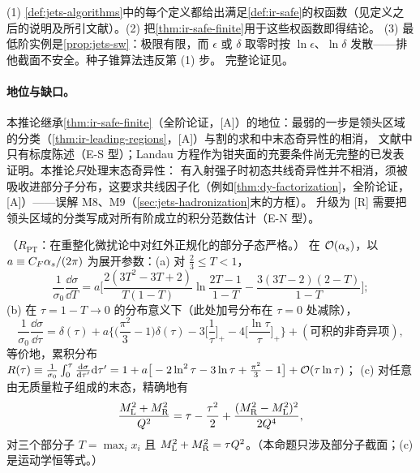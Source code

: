 \begin{proofsketch}
(1) \cref{def:jets-algorithms}中的每个定义都给出满足\cref{def:ir-safe}的权函数（见定义之后的说明及所引文献）。(2) 把\cref{thm:ir-safe-finite}用于这些权函数即得结论。
(3) 最低阶实例是\cref{prop:jets-sw}：极限有限，而 $\epsilon$ 或 $\delta$ 取零时按 $\ln\epsilon$、$\ln\delta$ 发散——排他截面不安全。种子锥算法违反第 (1) 步。
完整论证见\cite{Sterman1978a,Sterman1978b,Sterman:1979uw,StermanWeinberg1977}。
\end{proofsketch}

\paragraph{地位与缺口。}
本推论继承\cref{thm:ir-safe-finite}（全阶论证，[A]）的地位：最弱的一步是领头区域的分类（\cref{thm:ir-leading-regions}，[A]）与割的求和中末态奇异性的相消，
文献中只有标度陈述（E-S 型）；Landau 方程作为钳夹面的充要条件尚无完整的已发表证明\cite[第~5.4.3~节]{Collins2011}。本推论\emph{只}处理末态奇异性：
有入射强子时初态共线奇异性并不相消，须被吸收进部分子分布，这要求共线因子化（例如\cref{thm:dy-factorization}，全阶论证，[A]）——误解 M8、M9（\cref{sec:jets-hadronization}末的方框）。
升级为 [R] 需要把领头区域的分类写成对所有阶成立的积分范数估计（E-N 型）。

\begin{proposition}\label{prop:jets-thrust-lo}
（$R_{\mathrm{PT}}$：在重整化微扰论中对红外正规化的部分子态严格。）
在 $\mathcal{O}\!\left(\alpha_s\right)$，以 $a\equiv C_F\alpha_s/(2\pi)$ 为展开参数：(a) 对 $\frac23\le T<1$，
\begin{equation}\label{eq:jets-thrust-lo}
\frac{1}{\sigma_0}\frac{\dd\sigma}{\dd T}=a\Big[\frac{2(3T^2-3T+2)}{T(1-T)}\ln\frac{2T-1}{1-T}-\frac{3(3T-2)(2-T)}{1-T}\Big];
\end{equation}
(b) 在 $\tau=1-T\to0$ 的分布意义下（此处加号分布在 $\tau=0$ 处减除），
\begin{equation}\label{eq:jets-thrust-sing}
\frac{1}{\sigma_0}\frac{\dd\sigma}{\dd\tau}=\delta(\tau)+a\Big\{\Big(\frac{\pi^2}{3}-1\Big)\delta(\tau)-3\Big[\frac1\tau\Big]_+-4\Big[\frac{\ln\tau}{\tau}\Big]_+\Big\}+(\text{可积的非奇异项}),
\end{equation}
等价地，累积分布 $R(\tau)\equiv\frac1{\sigma_0}\int_0^\tau\frac{\mathrm{d}\sigma}{\mathrm{d}\tau'}\mathrm{d}\tau'=1+a\big[-2\ln^2\tau-3\ln\tau+\frac{\pi^2}{3}-1\big]+\mathcal{O}\!\left(\tau\ln\tau\right)$；
(c) 对任意由无质量粒子组成的末态，精确地有
\begin{equation}\label{eq:jets-hemi}
\frac{M_{\rm L}^2+M_{\rm R}^2}{Q^2}=\tau-\frac{\tau^2}{2}+\frac{(M_{\rm R}^2-M_{\rm L}^2)^2}{2Q^4},
\end{equation}
对三个部分子 $T=\max_ix_i$ 且 $M_{\rm L}^2+M_{\rm R}^2=\tau Q^2$。（本命题只涉及部分子截面；(c) 是运动学恒等式。）
\end{proposition}

